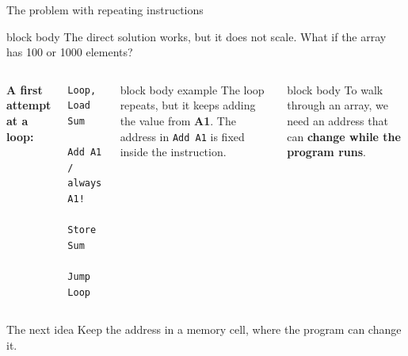\documentclass[aspectratio=169,10pt]{beamer}
\begin{document}
\begin{frame}[fragile]{The problem with repeating instructions}
  \begin{beamercolorbox}[rounded=true,sep=0.1cm,wd=\textwidth]{block body}
    \centering\small
    The direct solution works, but it does not scale. What if the array has 100 or 1000 elements?
  \end{beamercolorbox}
  \vspace{0.18cm}
  \begin{columns}[T,onlytextwidth]
      \footnotesize\textbf{A first attempt at a loop:}
\begin{lstlisting}[style=marie]
Loop, Load Sum
      Add A1   / always A1!
      Store Sum
      Jump Loop
\end{lstlisting}
      \begin{beamercolorbox}[rounded=true,sep=0.12cm,wd=\linewidth]{block body example}
        \footnotesize
        The loop repeats, but it keeps adding the value from \textbf{A1}. The address in \texttt{Add A1}
        is fixed inside the instruction.
      \end{beamercolorbox}
      \vspace{0.1cm}
      \begin{beamercolorbox}[rounded=true,sep=0.12cm,wd=\linewidth]{block body}
        \footnotesize
        To walk through an array, we need an address that can \textbf{change while the program runs}.
      \end{beamercolorbox}
  \end{columns}
  \vfill
  \begin{alertblock}{The next idea}
    \centering\small Keep the address in a memory cell, where the program can change it.
  \end{alertblock}
\end{frame}
\end{document}
